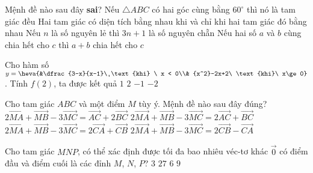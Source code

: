 \begin{ex}%
Mệnh đề nào sau đây {\bf sai}?
\choice
{Nếu $\triangle ABC$ có hai góc cùng bằng $60^\circ$ thì nó là tam giác đều}
{\True Hai tam giác có diện tích bằng nhau khi và chỉ khi hai tam giác đó bằng nhau}
{Nếu $n$  là số nguyên lẻ thì $3n+1$  là số nguyên chẵn}
{Nếu hai số $a$ và $b$ cùng chia hết cho $c$ thì $a+b$ chia hết cho $c$}
\loigiai
{
}
\end{ex}

\begin{ex}%
Cho hàm số $y=\heva{&\dfrac{3-x}{x-1}\ \text{khi}  \ x < 0\\& {x^2}-2x+2\ \text{khi}\ x\ge 0}
$. Tính $f\left(2\right)$, ta được kết quả
\choice
{$1$}
{\True $2$}
{$-1$}
{$-2$}
\end{ex}

\begin{ex}%
Cho tam giác $ABC$ và một điểm $M$ tùy ý. Mệnh đề nào sau đây đúng?
\choice
{$2\overrightarrow{MA}+\overrightarrow{MB}-3\overrightarrow{MC}=\overrightarrow{AC}+2\overrightarrow{BC}$}
{$2\overrightarrow{MA}+\overrightarrow{MB}-3\overrightarrow{MC}=2\overrightarrow{AC}+\overrightarrow{BC}$}
{\True $2\overrightarrow{MA}+\overrightarrow{MB}-3\overrightarrow{MC}=2\overrightarrow{CA}+\overrightarrow{CB}$}
{$2\overrightarrow{MA}+\overrightarrow{MB}-3\overrightarrow{MC}=2\overrightarrow{CB}-\overrightarrow{CA}$}
\end{ex}

\begin{ex}%
Cho tam giác $MNP$, có thể xác định được tối đa bao nhiêu véc-tơ khác $\overrightarrow{0}$ có điểm đầu và điểm cuối là các đỉnh $M$, $N$, $P$?
\choice
{$3$}
{$27$}
{\True $6$}
{$9$}
\end{ex}

